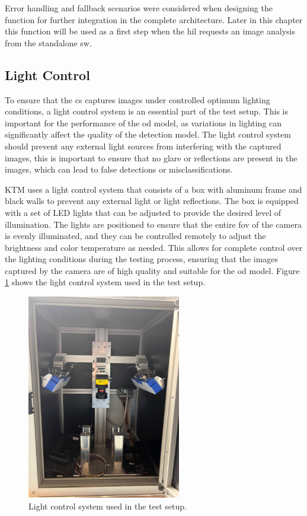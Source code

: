 Error handling and fallback scenarios were considered when designing the function for further integration in the complete architecture. Later in this chapter this function will be used as a first step when the \gls{hil} requests an image analysis from the standalone \gls{sw}.

\subsection{Light Control}
To ensure that the \gls{cs} captures images under controlled optimum lighting conditions, a light control system is an essential part of the test setup. This is important for the performance of the \gls{od} model, as variations in lighting can significantly affect the quality of the detection model. The light control system should prevent any external light sources from interfering with the captured images, this is important to ensure that no glare or reflections are present in the images, which can lead to false detections or misclassifications.

KTM uses a light control system that consists of a box with aluminum frame and black walls to prevent any external light or light reflections. The box is equipped with a set of LED lights that can be adjusted to provide the desired level of illumination. The lights are positioned to ensure that the entire \gls{fov} of the camera is evenly illuminated, and they can be controlled remotely to adjust the brightness and color temperature as needed. This allows for complete control over the lighting conditions during the testing process, ensuring that the images captured by the camera are of high quality and suitable for the \gls{od} model. Figure \ref{LightControl} shows the light control system used in the test setup.

\begin{figure}[!htb]
    \centering
    \includegraphics[width=0.6\textwidth]{Figures/Light_Control_Box.jpg}
    \caption{Light control system used in the test setup.}
    \label{LightControl}
\end{figure}

